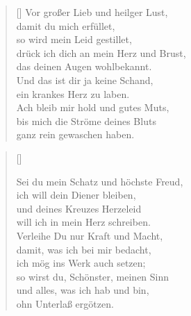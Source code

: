 \begin{multicols}{2}
\begin{verse}[\versewidth]
 Vor großer Lieb und heilger Lust,\\
damit du mich erfüllet,\\
so wird mein Leid gestillet,\\
drück ich dich an mein Herz und Brust,\\
das deinen Augen wohlbekannt.\\
Und das ist dir ja keine Schand,\\
ein krankes Herz zu laben.\\
Ach bleib mir hold und gutes Muts,\\
bis mich die Ströme deines Bluts\\
ganz rein gewaschen haben.

\end{verse}
\end{multicols}

\begin{center}
\settowidth{\versewidth}{Sei du mein Schatz und höchste Freud,}
\begin{verse}[\versewidth]




 Sei du mein Schatz und höchste Freud,\\
ich will dein Diener bleiben,\\
und deines Kreuzes Herzeleid\\
will ich in mein Herz schreiben.\\
Verleihe Du nur Kraft und Macht,\\
damit, was ich bei mir bedacht,\\
ich mög ins Werk auch setzen;\\
so wirst du, Schönster, meinen Sinn\\
und alles, was ich hab und bin,\\
ohn Unterlaß ergötzen.

  
\end{verse}
\end{center}

